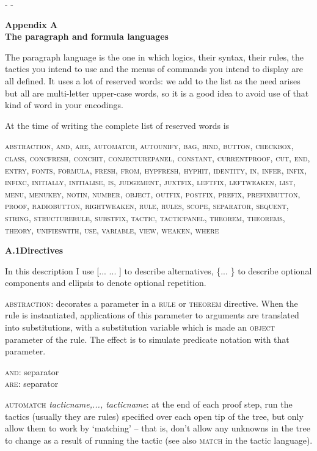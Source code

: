 \documentclass[11pt]{book}
\newcommand{\tab}{\hspace{5mm}}
\begin{document}
\begin{center} -  -


\end{center} \textbf{{\huge Appendix A\\
The paragraph and formula languages}}


The paragraph language is the one in which logics, their syntax, their rules, the tactics you intend to use and the menus of commands you intend to display are all defined. It uses a lot of reserved words: we add to the list as the need arises but all are multi-letter upper-case words, so it is a good idea to avoid use of that kind of word in your encodings.


At the time of writing the complete list of reserved words is


\textsc{abstraction, and, are, automatch, autounify, bag, bind, button, checkbox, class, concfresh, conchit, conjecturepanel, constant, currentproof, cut, end, entry, fonts, formula, fresh, from, hypfresh, hyphit, identity, in, infer, infix, infixc, initially, initialise, is, judgement, juxtfix, leftfix, leftweaken, list, menu, menukey, notin, number, object, outfix, postfix, prefix, prefixbutton, proof, radiobutton, rightweaken, rule, rules, scope, separator, sequent, string, structurerule, substfix, tactic, tacticpanel, theorem, theorems, theory, unifieswith, use, variable, view, weaken, where}


\textbf{{\large A.1\tab Directives}}


In this description I use [... {\textbar}... ] to describe alternatives, \{... \} to describe optional components and ellipsis to denote optional repetition.


\textsc{abstraction}: decorates a parameter in a \textsc{rule} or \textsc{theorem} directive. When the rule is instantiated, applications of this parameter to arguments are translated into substitutions, with a substitution variable which is made an \textsc{object} parameter of the rule. The effect is to simulate predicate notation with that parameter.


\textsc{and}: separator\\
\textsc{are}: separator


\textsc{automatch} \textit{tacticname,..., tacticname}: at the end of each proof step, run the tactics (usually they are rules) specified over each open tip of the tree, but only allow them to work by `matching' -- that is, don't allow any unknowns in the tree to change as a result of running the tactic (see also \textsc{match} in the tactic language).
\end{document}
